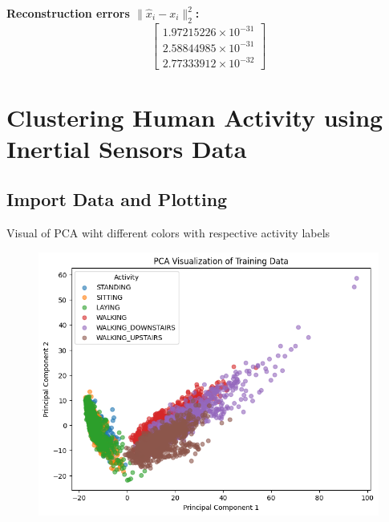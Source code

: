 \documentclass{article}
\begin{document}
\begin{enumerate}
    \textbf{Reconstruction errors $\|\hat{x}_i - x_i\|_2^2$:}
    \[
    \begin{bmatrix}
        1.97215226 \times 10^{-31} \\
        2.58844985 \times 10^{-31} \\
        2.77333912 \times 10^{-32}
    \end{bmatrix}
    \]
    
\end{enumerate}


\clearpage

\section{Clustering Human Activity using Inertial Sensors Data}

\subsection{Import Data and Plotting}
Visual of PCA wiht different colors with respective activity labels

\begin{figure}[H]
    \centering
    \includegraphics[width=1\textwidth]{image.png}
    \label{fig:human_activity_pca}
\end{figure}

\clearpage
\end{document}
